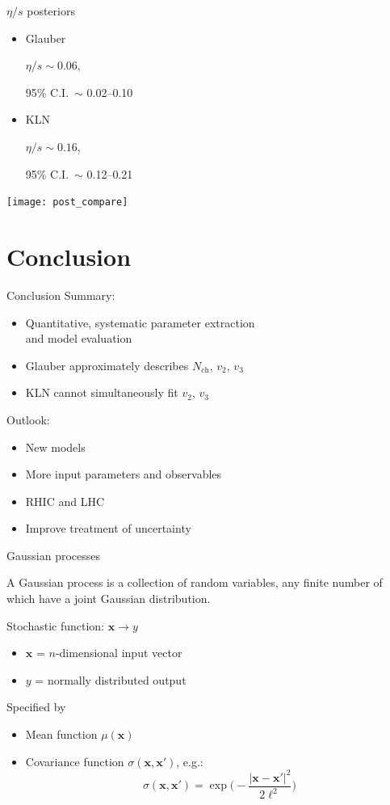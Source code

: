 \documentclass{beamer}
\newcommand{\nch}{N_\text{ch}}
\newcommand{\x}{\mathbf x}
\begin{document}
\begin{frame}{$\eta/s$ posteriors}
  \begin{itemize}
    \item
      \parbox{3.5em}{Glauber}
      \parbox{5em}{$\eta/s \sim 0.06$,}
      95\% C.I.\ $\sim$ 0.02--0.10
    \item
      \parbox{3.5em}{KLN}
      \parbox{5em}{$\eta/s \sim 0.16$,}
      95\% C.I.\ $\sim$ 0.12--0.21
  \end{itemize}
  \medskip
  \centering
  \texttt{[image: post\_compare]}
\end{frame}


\section{Conclusion}

\begin{frame}{Conclusion}
  Summary:
  \begin{itemize}
    \item Quantitative, systematic parameter extraction \\ and model evaluation
    \item Glauber approximately describes $\nch$, $v_2$, $v_3$
    \item KLN cannot simultaneously fit $v_2$, $v_3$
  \end{itemize}
  \bigskip
  Outlook:
  \begin{itemize}
    \item New models
    \item More input parameters and observables
    \item RHIC and LHC
    \item Improve treatment of uncertainty
  \end{itemize}
\end{frame}


\appendix


\begin{frame}{Gaussian processes}
  \begin{definition}
    A Gaussian process is a collection of random variables, any finite number of which have a joint Gaussian distribution.
  \end{definition}
  \medskip
  Stochastic function: $\x \rightarrow y$ \\
  \begin{itemize}
    \item $\x$ = $n$-dimensional input vector
    \item $y$ = normally distributed output
  \end{itemize}
  Specified by
  \begin{itemize}
    \item Mean function $\mu(\x)$
    \item Covariance function $\sigma(\x, \x')$, e.g.:
      \begin{equation*}
        \sigma(\x, \x') = \exp\biggl( -\frac{|\x - \x'|^2}{2\ell^2} \biggr)
      \end{equation*}
  \end{itemize}
\end{frame}
\end{document}
